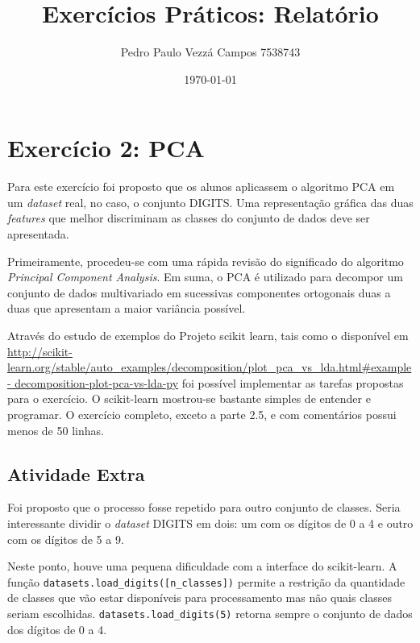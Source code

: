 \documentclass[brazil]{article}
\begin{document}
\title{Exercícios Práticos: Relatório}
\author{Pedro Paulo Vezzá Campos \hfill 7538743}
\date{\today}

\maketitle


\section{Exercício 2: PCA}
Para este exercício foi proposto que os alunos aplicassem o algoritmo PCA em
um \emph{dataset} real, no caso, o conjunto DIGITS. Uma representação gráfica
das duas \emph{features} que melhor discriminam as classes do conjunto de dados
deve ser apresentada.

Primeiramente, procedeu-se com uma rápida revisão do significado do algoritmo
\emph{Principal Component Analysis}. Em suma, o PCA é utilizado para decompor
um conjunto de dados multivariado em sucessivas componentes ortogonais duas a 
duas que apresentam a maior variância possível.

Através do estudo de exemplos do Projeto scikit learn, tais como o disponível em
\url{http://scikit-
learn.org/stable/auto_examples/decomposition/plot_pca_vs_lda.html#example-
decomposition-plot-pca-vs-lda-py} foi possível implementar as tarefas propostas
para o exercício. O scikit-learn mostrou-se bastante simples de entender e
programar. O exercício completo, exceto a parte 2.5, e com comentários possui
menos de 50 linhas.

\subsection{Atividade Extra}
Foi proposto que o processo fosse repetido para outro conjunto de classes. Seria
interessante dividir o \emph{dataset} DIGITS em dois: um com os dígitos de 0 a 4
e outro com os dígitos de 5 a 9.

Neste ponto, houve uma pequena dificuldade com a interface do scikit-learn.
A função \texttt{datasets.load\_digits([n\_classes])} permite a restrição
da quantidade de classes que vão estar disponíveis para processamento mas não
quais classes seriam escolhidas. \texttt{datasets.load\_digits(5)} retorna 
sempre o conjunto de dados dos dígitos de 0 a 4.
\end{document}
